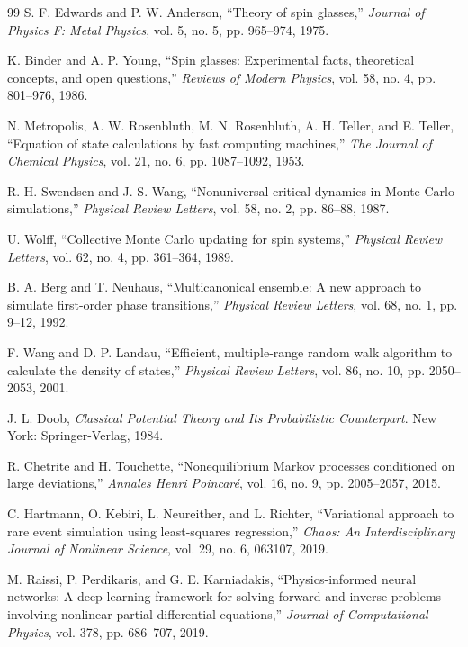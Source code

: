 \documentclass[a4paper,fleqn]{cas-sc}
\begin{document}
\begin{thebibliography}{99}
		S. F. Edwards and P. W. Anderson, ``Theory of spin glasses,'' \emph{Journal of Physics F: Metal Physics}, vol. 5, no. 5, pp. 965--974, 1975.
		
		K. Binder and A. P. Young, ``Spin glasses: Experimental facts, theoretical concepts, and open questions,'' \emph{Reviews of Modern Physics}, vol. 58, no. 4, pp. 801--976, 1986.
		
		N. Metropolis, A. W. Rosenbluth, M. N. Rosenbluth, A. H. Teller, and E. Teller, ``Equation of state calculations by fast computing machines,'' \emph{The Journal of Chemical Physics}, vol. 21, no. 6, pp. 1087--1092, 1953.
		
		R. H. Swendsen and J.-S. Wang, ``Nonuniversal critical dynamics in Monte Carlo simulations,'' \emph{Physical Review Letters}, vol. 58, no. 2, pp. 86--88, 1987.
		
		U. Wolff, ``Collective Monte Carlo updating for spin systems,'' \emph{Physical Review Letters}, vol. 62, no. 4, pp. 361--364, 1989.
		
		B. A. Berg and T. Neuhaus, ``Multicanonical ensemble: A new approach to simulate first-order phase transitions,'' \emph{Physical Review Letters}, vol. 68, no. 1, pp. 9--12, 1992.
		
		F. Wang and D. P. Landau, ``Efficient, multiple-range random walk algorithm to calculate the density of states,'' \emph{Physical Review Letters}, vol. 86, no. 10, pp. 2050--2053, 2001.
		
		J. L. Doob, \emph{Classical Potential Theory and Its Probabilistic Counterpart}. New York: Springer-Verlag, 1984.
		
		R. Chetrite and H. Touchette, ``Nonequilibrium Markov processes conditioned on large deviations,'' \emph{Annales Henri Poincar\'{e}}, vol. 16, no. 9, pp. 2005--2057, 2015.
		
		C. Hartmann, O. Kebiri, L. Neureither, and L. Richter, ``Variational approach to rare event simulation using least-squares regression,'' \emph{Chaos: An Interdisciplinary Journal of Nonlinear Science}, vol. 29, no. 6, 063107, 2019.
		
		M. Raissi, P. Perdikaris, and G. E. Karniadakis, ``Physics-informed neural networks: A deep learning framework for solving forward and inverse problems involving nonlinear partial differential equations,'' \emph{Journal of Computational Physics}, vol. 378, pp. 686--707, 2019.
		

\end{thebibliography}
\end{document}
